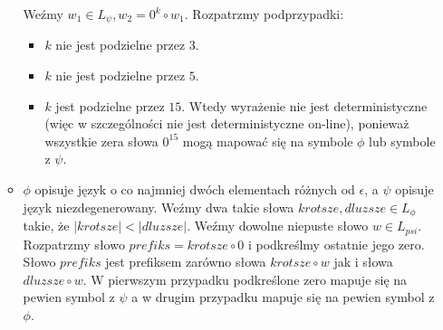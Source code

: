 \documentclass[a4paper]{article}
\begin{document}
\begin{enumerate}
\begin{itemize}
Weźmy $w_1 \in L_{\psi}, w_2 = 0^k \circ w_1$. Rozpatrzmy podprzypadki:
      \begin{itemize}
        \item $k$ nie jest podzielne przez $3$.
        \item $k$ nie jest podzielne przez $5$.
        \item $k$ jest podzielne przez $15$. Wtedy wyrażenie nie jest deterministyczne (więc w szczególności nie jest deterministyczne on-line), ponieważ wszystkie zera słowa $0^{15}$ mogą mapować się na symbole $\phi$ lub symbole z $\psi$.
      \end{itemize}
    \item $\phi$ opisuje język o co najmniej dwóch elementach różnych od $\epsilon$, a $\psi$ opisuje język niezdegenerowany. Weźmy dwa takie słowa $krotsze, dluzsze \in L_{\phi}$ takie, że $|krotsze| < |dluzsze|$. Weźmy dowolne niepuste słowo $w \in L_{psi}$. Rozpatrzmy słowo $prefiks = krotsze \circ 0$ i podkreślmy ostatnie jego zero. Słowo $prefiks$ jest prefiksem zarówno słowa $krotsze \circ w$ jak i słowa $dluzsze \circ w$. W pierwszym przypadku podkreślone zero mapuje się na pewien symbol z $\psi$ a w drugim przypadku mapuje się na pewien symbol z $\phi$.
  \end{itemize}
\end{enumerate}
\end{document}
